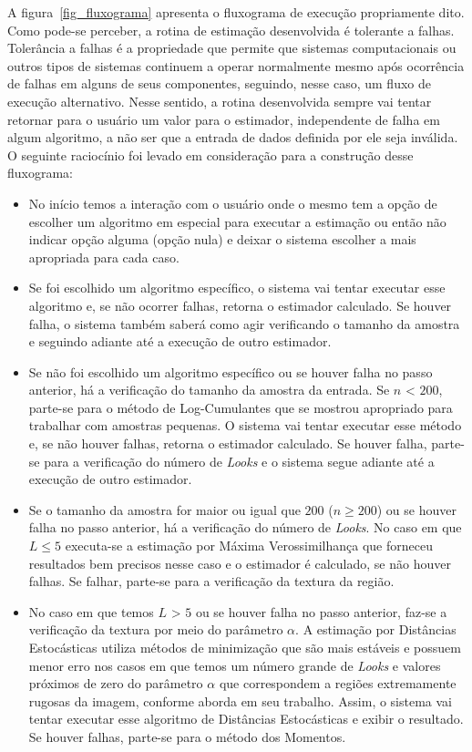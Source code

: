 A figura~\ref{fig_fluxograma} apresenta o fluxograma de execução propriamente dito. Como pode-se perceber, a rotina de estimação desenvolvida é tolerante a falhas. Tolerância a falhas é a propriedade que permite que sistemas computacionais ou outros tipos de sistemas continuem a operar normalmente mesmo após ocorrência de falhas em alguns de seus componentes, seguindo, nesse caso, um fluxo de execução alternativo. Nesse sentido, a rotina desenvolvida sempre vai tentar retornar para o usuário um valor para o estimador, independente de falha em algum algoritmo, a não ser que a entrada de dados definida por ele seja inválida. O seguinte raciocínio foi levado em consideração para a construção desse fluxograma:
\begin{itemize}
    \item No início temos a interação com o usuário onde o mesmo tem a opção de escolher um algoritmo em especial para executar a estimação ou então não indicar opção alguma (opção nula) e deixar o sistema escolher a mais apropriada para cada caso.
    \item Se foi escolhido um algoritmo específico, o sistema vai tentar executar esse algoritmo e, se não ocorrer falhas, retorna o estimador calculado. Se houver falha, o sistema também saberá como agir verificando o tamanho da amostra e seguindo adiante até a execução de outro estimador.
    \item Se não foi escolhido um algoritmo específico ou se houver falha no passo anterior, há a verificação do tamanho da amostra da entrada. Se $n$ < $200$, parte-se para o método de Log-Cumulantes que se mostrou apropriado para trabalhar com amostras pequenas. O sistema vai tentar executar esse método e, se não houver falhas, retorna o estimador calculado. Se houver falha, parte-se para a verificação do número de \textit{Looks} e o sistema segue adiante até a execução de outro estimador.
    \item Se o tamanho da amostra for maior ou igual que $200$ ($n \geq 200$) ou se houver falha no passo anterior, há a verificação do número de \textit{Looks}. No caso em que $L \leq 5$ executa-se a estimação por Máxima Verossimilhança que forneceu resultados bem precisos nesse caso e o estimador é calculado, se não houver falhas. Se falhar, parte-se para a verificação da textura da região.
    \item No caso em que temos $L$ > $5$ ou se houver falha no passo anterior, faz-se a verificação da textura por meio do parâmetro $\alpha$. A estimação por Distâncias Estocásticas utiliza métodos de minimização que são mais estáveis e possuem menor erro nos casos em que temos um número grande de \textit{Looks} e valores próximos de zero do parâmetro $\alpha$ que correspondem a regiões extremamente rugosas da imagem, conforme aborda \citet{Cassetti2013} em seu trabalho. Assim, o sistema vai tentar executar esse algoritmo de Distâncias Estocásticas e exibir o resultado. Se houver falhas, parte-se para o método dos Momentos. 

\end{itemize}
